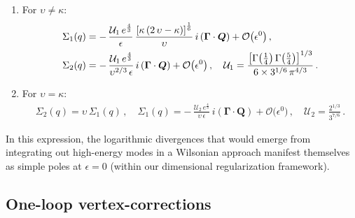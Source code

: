 \begin{enumerate}



\item For $ \upsilon \neq \kappa $:
\begin{align}
\Sigma_1 (q) & = -\, 
 \frac{  {\mathcal U}_1 \,e^{\frac{4} {3}} 
 }   { \epsilon}  \,
\frac{ \left [ 
\kappa  \, (2  \,\upsilon - \kappa)
\right]^{\frac{1} {6}} }
{\upsilon}
\, i\left( \mathbf{\Gamma} \cdot \boldsymbol Q \right)
+\mathcal{O}\big(\epsilon^0\big) \,,\nonumber \\
\Sigma_2 (q) & = -\, 
 \frac{  {\mathcal U}_1 \,e^{\frac{4} {3}} 
 }   { \upsilon^{2/3} \, \epsilon}
\, i\left( \mathbf{\Gamma} \cdot \boldsymbol Q \right)
+\mathcal{O}\big(\epsilon^0\big) \,,\quad
{\mathcal U}_1 = \frac {\left[
\Gamma\big (\frac {1} {4} \big) \,
\Gamma\big (\frac {5} {4} \big) \right ]^{1/3}
} 
{ 6 \times  {3}^{1/6} \, \pi^{4/3}} \,.
\end{align}

\item For $ \upsilon = \kappa $:
\begin{align}
\Sigma_2 (q) =\upsilon \,\Sigma_1 (q)\,,\quad
\Sigma_1 (q)  = -\, 
 \frac{  {\mathcal U}_2 \,e^{\frac{4} {3}} 
 }   { \upsilon \, \epsilon}
\, i\left( \mathbf{\Gamma} \cdot \boldsymbol Q \right)
+\mathcal{O}\big(\epsilon^0\big) 
\,,\quad
{\mathcal U}_2 = \frac{2^{1/3}}
{  3^{7/6} } \,.
\end{align}


\end{enumerate}
In this expression, the logarithmic divergences that would emerge from 
integrating out high-energy modes in a Wilsonian approach manifest 
themselves as simple poles at $\epsilon = 0$ (within our dimensional 
regularization framework).


\subsection{One-loop vertex-corrections}

